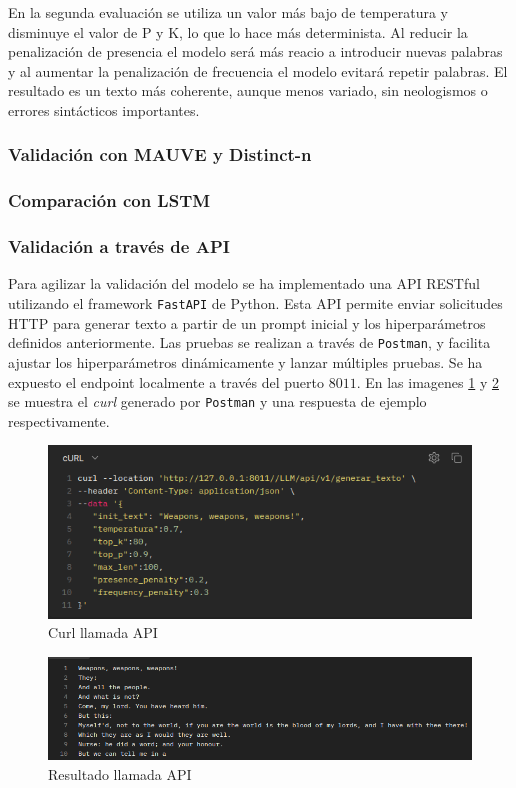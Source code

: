 \documentclass[11pt]{book}
\begin{document}
En la segunda evaluación se utiliza un valor más bajo de temperatura y disminuye el valor de P y K, lo que lo hace más determinista. Al reducir la penalización de presencia el modelo será más reacio a introducir nuevas palabras y al aumentar la penalización de frecuencia el modelo evitará repetir palabras. El resultado es un texto más coherente, aunque menos variado, sin neologismos o errores sintácticos importantes.

\subsubsection{Validación con MAUVE y Distinct-n}

\subsubsection{Comparación con LSTM}


\subsubsection{Validación a través de API}

Para agilizar la validación del modelo se ha implementado una API RESTful utilizando el framework \texttt{FastAPI} de Python. Esta API permite enviar solicitudes HTTP para generar texto a partir de un prompt inicial y los hiperparámetros definidos anteriormente. Las pruebas se realizan a través de \texttt{Postman}, y facilita ajustar los hiperparámetros dinámicamente y lanzar múltiples pruebas. Se ha expuesto el endpoint \textit{} localmente a través del puerto $8011$. En las imagenes \ref{fig:placeholder27} y \ref{fig:placeholder28} se muestra el \textit{curl} generado por \texttt{Postman} y una respuesta de ejemplo respectivamente.

\begin{figure}[h]
    \centering
    \includegraphics[width=0.5\linewidth]{img/api_curl.png}
    \caption{Curl llamada API}
    \label{fig:placeholder27}
\end{figure}

\begin{figure}[h]
    \centering
    \includegraphics[width=0.5\linewidth]{img/api_res.png}
    \caption{Resultado llamada API}
    \label{fig:placeholder28}
\end{figure}
\end{document}
